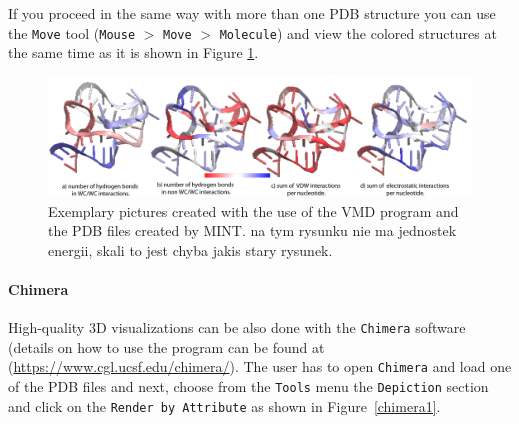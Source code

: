 \documentclass[12pt]{article}
\begin{document}
If you proceed in the same way with more than one PDB structure you can use the \texttt{Move} tool (\texttt{Mouse} $>$ \texttt{Move} $>$ \texttt{Molecule}) and view the colored structures at the same time as it is shown in Figure \ref{3Ddifferent}.

\begin{figure}[h!]
\centering
\includegraphics[scale=0.65]{./pictures/3D_different.png}
\caption{Exemplary pictures created with the use of the VMD program and the PDB files created by MINT. {\color{red} na tym rysunku nie ma jednostek energii, skali to jest chyba jakis stary rysunek.}}
\label{3Ddifferent}
\end{figure}

\paragraph{Chimera}
High-quality 3D visualizations can be also done with the {\tt Chimera} software (details on how to use the program can be found at (\url{https://www.cgl.ucsf.edu/chimera/}). The user has to open {\tt Chimera} and load one of the PDB files and next, choose from the \texttt{Tools} menu the \texttt{Depiction} section and click on the \texttt{Render by Attribute} as shown in Figure~\ref{chimera1}.
\end{document}

